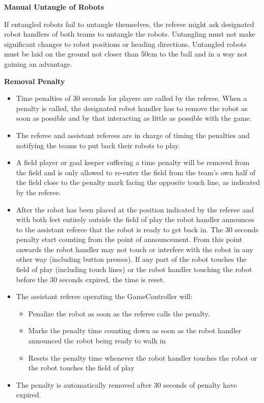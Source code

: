 \bigskip

{\bfseries Manual Untangle of Robots}

If entangled robots fail to untangle themselves, the referee might ask designated robot handlers of both teams to untangle the robots. Untangling must not make
significant changes to robot positions or heading directions. Untangled robots must be laid on the ground not closer than 50cm to the ball and in a way not gaining an advantage.

\bigskip


{\bfseries Removal Penalty}

\begin{itemize}
\item Time penalties of 30 seconds for players are called by the referee. When a penalty is called, the designated robot handler has to remove the robot as soon as possible and by that interacting as little as possible with the game. 
\item The referee and assistant referees are in charge of timing the penalties and notifying the teams to put back their robots to play.
\item A field player or goal keeper suffering a time penalty will be removed from the field and is only allowed to re-enter the field from the team's own half of the field close to the penalty mark facing the opposite touch line, as indicated by the referee.
\item After the robot has been placed at the position indicated by the referee
      and with both feet entirely outside the field of play the robot handler
      announces to the assistant referee that the robot is ready to get back in.
      The 30 seconds penalty start counting from the point of announcement.
      From this point onwards the robot handler may not touch or interfere with
      the robot in any other way (including button presses).
      If any part of the robot touches the field of play (including touch lines)
      or the robot handler touching the robot before the 30 seconds expired,
      the time is reset.
\item The assistant referee operating the GameController will:
\begin{itemize}
\item Penalize the robot as soon as the referee calls the penalty.
\item Marks the penalty time counting down as soon as the robot handler
      announced the robot being ready to walk in
\item Resets the penalty time whenever the robot handler touches the robot or
      the robot touches the field of play
\end{itemize}
\item The penalty is automatically removed after 30 seconds of penalty have expired.
\end{itemize}


